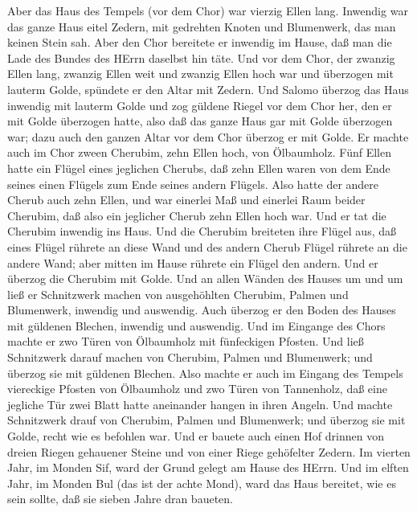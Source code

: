  Aber das Haus des Tempels (vor dem Chor) war vierzig Ellen
lang.  Inwendig war das ganze Haus eitel Zedern, mit
gedrehten Knoten und Blumenwerk, das man keinen Stein sah. 
Aber den Chor bereitete er inwendig im Hause, daß man die Lade des
Bundes des HErrn daselbst hin täte.  Und vor dem Chor, der
zwanzig Ellen lang, zwanzig Ellen weit und zwanzig Ellen hoch war und
überzogen mit lauterm Golde, spündete er den Altar mit Zedern.
 Und Salomo überzog das Haus inwendig mit lauterm Golde und
zog güldene Riegel vor dem Chor her, den er mit Golde überzogen hatte,
 also daß das ganze Haus gar mit Golde überzogen war; dazu
auch den ganzen Altar vor dem Chor überzog er mit Golde. 
Er machte auch im Chor zween Cherubim, zehn Ellen hoch, von Ölbaumholz.
 Fünf Ellen hatte ein Flügel eines jeglichen Cherubs, daß
zehn Ellen waren von dem Ende seines einen Flügels zum Ende seines
andern Flügels.  Also hatte der andere Cherub auch zehn
Ellen, und war einerlei Maß und einerlei Raum beider Cherubim,
 daß also ein jeglicher Cherub zehn Ellen hoch war.
 Und er tat die Cherubim inwendig ins Haus. Und die
Cherubim breiteten ihre Flügel aus, daß eines Flügel rührete an diese
Wand und des andern Cherub Flügel rührete an die andere Wand; aber
mitten im Hause rührete ein Flügel den andern.  Und er
überzog die Cherubim mit Golde.  Und an allen Wänden des
Hauses um und um ließ er Schnitzwerk machen von ausgehöhlten Cherubim,
Palmen und Blumenwerk, inwendig und auswendig.  Auch
überzog er den Boden des Hauses mit güldenen Blechen, inwendig und
auswendig.  Und im Eingange des Chors machte er zwo Türen
von Ölbaumholz mit fünfeckigen Pfosten.  Und ließ
Schnitzwerk darauf machen von Cherubim, Palmen und Blumenwerk; und
überzog sie mit güldenen Blechen.  Also machte er auch im
Eingang des Tempels viereckige Pfosten von Ölbaumholz  und
zwo Türen von Tannenholz, daß eine jegliche Tür zwei Blatt hatte
aneinander hangen in ihren Angeln.  Und machte Schnitzwerk
drauf von Cherubim, Palmen und Blumenwerk; und überzog sie mit Golde,
recht wie es befohlen war.  Und er bauete auch einen Hof
drinnen von dreien Riegen gehauener Steine und von einer Riege
gehöfelter Zedern.  Im vierten Jahr, im Monden Sif, ward
der Grund gelegt am Hause des HErrn.  Und im elften Jahr,
im Monden Bul (das ist der achte Mond), ward das Haus bereitet, wie es
sein sollte, daß sie sieben Jahre dran baueten.

